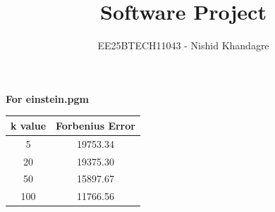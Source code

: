 \documentclass[journal]{IEEEtran}
\title{Software Project}
\author{EE25BTECH11043 - Nishid Khandagre}
\begin{document}
\maketitle

\renewcommand{\thefigure}{\theenumi}
\renewcommand{\thetable}{\theenumi}

\textbf{For einstein.pgm}

\begin{table}[H]
    \centering
    \begin{tabular}{|c|c|}
        \hline
        \textbf{k value} & \textbf{Forbenius Error} \\  
        \hline
        5 & 19753.34 \\                              
        \hline
        20 & 19375.30 \\                         
        \hline
        50 & 15897.67 \\       
        \hline
        100 & 11766.56 \\       
        \hline
    \end{tabular}
       \label{tab:1}
\end{table}
\end{document}

